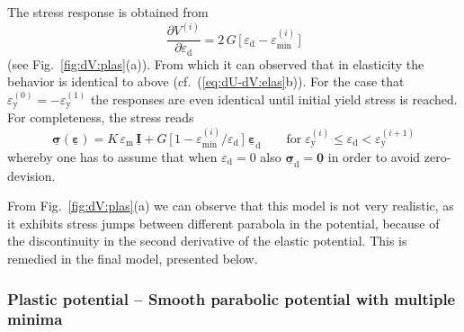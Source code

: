 \documentclass[times,namecite]{goose-article}
\newcommand\T[1]{\underline{\bm{{#1}}}}
\begin{document}
The stress response is obtained from
\begin{equation}\label{eq:dV-plas}
  \frac{\partial V^{(i)}}{\partial \varepsilon_\mathrm{d}}
  =
  2 \, G \, \Big[\, \varepsilon_\mathrm{d} - \varepsilon_\mathrm{min}^{(i)} \,\Big]
\end{equation}
(see Fig.~\ref{fig:dV:plas}(a)). From which it can observed that in elasticity the behavior is identical to above (cf.~(\ref{eq:dU-dV:elas}b)). For the case that $\varepsilon_\mathrm{y}^{(0)} = - \varepsilon_\mathrm{y}^{(1)}$ the responses are even identical until initial yield stress is reached. For completeness, the stress reads
\begin{equation}
  \T{\sigma} ( \T{\varepsilon} )
  =
  K \, \varepsilon_\mathrm{m} \, \T{I}
  +
  G \, \Big[\, 1 - \varepsilon_\mathrm{min}^{(i)} / \varepsilon_\mathrm{d} \,\Big] \;
  \T{\varepsilon}_\mathrm{d}
  \qquad
  \mathrm{for}
  \;
  \varepsilon_\mathrm{y}^{(i)} \leq \varepsilon_\mathrm{d} < \varepsilon_\mathrm{y}^{(i+1)}
\end{equation}
whereby one has to assume that when $\varepsilon_\mathrm{d} = 0$ also $\T{\sigma}_\mathrm{d} = \T{0}$ in order to avoid zero-devision.

From Fig.~\ref{fig:dV:plas}(a) we can observe that this model is not very realistic, as it exhibits stress jumps between different parabola in the potential, because of the discontinuity in the second derivative of the elastic potential. This is remedied in the final model, presented below.

\subsubsection{Plastic potential -- Smooth parabolic potential with multiple minima}
\end{document}
